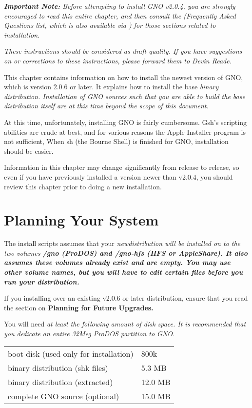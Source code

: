 \documentclass{report}
\begin{document}
\em 
\textbf{Important Note:}
Before attempting to install GNO v2.0.4, you are strongly encouraged to 
read this entire chapter, and then consult the 
 (Frequently Asked Questions list, which is also
available via ) for those sections related to installation.
\rm

\em These instructions should be considered as draft quality.  If you
have suggestions on or corrections to these instructions, please forward
them to Devin Reade.\rm

This chapter contains information on how to install the newest version
of GNO, which is version 2.0.6 or later.  It explains how to install
the base \em binary \rm  distribution.  Installation of GNO sources such that
you are able to \em build \rm  the base distribution itself are at this
time beyond the scope of this document.

At this time, unfortunately, installing GNO is fairly cumbersome.
Gsh's scripting abilities are crude at best, and for various reasons
the Apple Installer program is not sufficient,
When sh (the Bourne Shell) is finished for GNO, installation should be easier.

Information in this chapter may change
significantly from release to release, so even if you have previously
installed a version newer than v2.0.4, you should review this chapter
prior to doing a new installation.

\section{Planning Your System}

The install scripts assumes that your \em new\rm  distribution will be 
installed on to the two volumes \bf /gno \rm  (ProDOS) and \bf /gno-hfs \rm 
(HFS or AppleShare).
It also assumes these volumes already exist and are \em empty\rm.
You may use other volume names,
but you will have to edit certain files before you run your distribution.

If you installing over an existing v2.0.6 or later distribution, ensure
that you read the section on \bf Planning for Future Upgrades\rm.

You will need \it at least \rm  the following amount of disk space.  
It is recommended that you dedicate an entire 32Meg ProDOS partition to
GNO.

\begin{tabular}{ll}
boot disk (used only for installation)	& 800k \\
binary distribution (shk files)		& 5.3 MB \\
binary distribution (extracted)		& 12.0 MB \\
complete GNO source (optional)		& 15.0 MB \\
\end{tabular}
\end{document}
